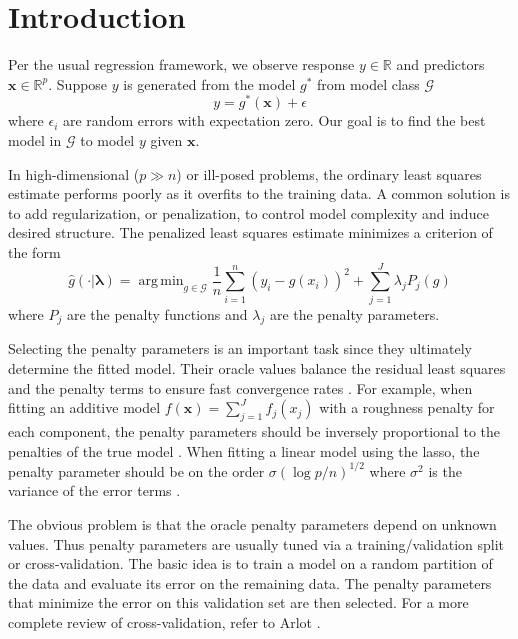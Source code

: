 \documentclass[12pt]{article}
\DeclareMathOperator*{\argmin}{arg\,min}
\begin{document}
\newpage
{}
\section{Introduction}

Per the usual regression framework, we observe response $y \in \mathbb{R}$ and predictors $\boldsymbol {x} \in \mathbb{R}^p$. Suppose $y$ is generated from the model $g^*$ from model class $\mathcal{G}$
\begin{equation}
y = g^*(\boldsymbol x) + \epsilon
\end{equation}
where $\epsilon_i$ are random errors with expectation zero. Our goal is to find the best model in $\mathcal{G}$ to model $y$ given $\boldsymbol x$.

In high-dimensional ($p \gg n$) or ill-posed problems, the ordinary least squares estimate performs poorly as it overfits to the training data. A common solution is to add regularization, or penalization, to control model complexity and induce desired structure. The penalized least squares estimate minimizes a criterion of the form
\begin{equation}
\label{intro_train_criterion}
\hat{g}(\cdot | \boldsymbol \lambda) = \argmin_{g\in \mathcal{G}} \frac{1}{n} \sum_{i=1}^n \left (y_i -  g(x_i) \right )^2 + \sum_{j=1}^J \lambda_j P_j(g)
\end{equation}
where $P_j$ are the penalty functions and $\lambda_j$ are the penalty parameters.

Selecting the penalty parameters is an important task since they ultimately determine the fitted model. Their oracle values balance the residual least squares and the penalty terms to ensure fast convergence rates \citep{van2000empirical}. For example, when fitting an additive model $f(\boldsymbol x) = \sum_{j=1}^J f_j(x_j)$ with a roughness penalty for each component, the penalty parameters should be inversely proportional to the penalties of the true model \citep{van2014additive}. When fitting a linear model using the lasso, the penalty parameter should be on the order $\sigma (\log p /n )^{1/2}$ where $\sigma^2$ is the variance of the error terms \citep{buhlmann2011statistics}.

The obvious problem is that the oracle penalty parameters depend on unknown values. Thus penalty parameters are usually tuned via a training/validation split or cross-validation. The basic idea is to train a model on a random partition of the data and evaluate its error on the remaining data. The penalty parameters that minimize the error on this validation set are then selected. For a more complete review of cross-validation, refer to Arlot \citep{arlot2010survey}.
\end{document}
